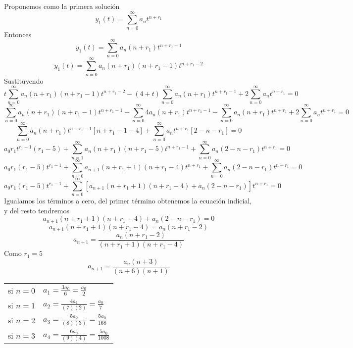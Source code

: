 \documentclass{article}
\begin{document}
\begin{enumerate}
{            Proponemos como la primera solución
            $$y_1(t)=\sum_{n=0}^{\infty}{a_nt^{n+r_1}}$$
            Entonces
            $$\dot y_1(t)=\sum_{n=0}^{\infty}{a_n(n+r_1)t^{n+r_1-1}}$$
            $$\ddot y_1(t)=\sum_{n=0}^{\infty}{a_n(n+r_1)(n+r_1-1)t^{n+r_1-2}}$$
            Sustituyendo
            \[
                t\sum_{n=0}^{\infty}{a_n(n+r_1)(n+r_1-1)t^{n+r_1-2}}
                -(4+t)\sum_{n=0}^{\infty}{a_n(n+r_1)t^{n+r_1-1}}
                +2\sum_{n=0}^{\infty}{a_nt^{n+r_1}}=0
            \]
            \[
                \sum_{n=0}^{\infty}{a_n(n+r_1)(n+r_1-1)t^{n+r_1-1}}
                -\sum_{n=0}^{\infty}{4a_n(n+r_1)t^{n+r_1-1}}
                -\sum_{n=0}^{\infty}{a_n(n+r_1)t^{n+r_1}}
                +2\sum_{n=0}^{\infty}{a_nt^{n+r_1}}=0
            \]
            \[
                \sum_{n=0}^{\infty}{a_n(n+r_1)t^{n+r_1-1}[n+r_1-1-4]}
                +\sum_{n=0}^{\infty}{a_nt^{n+r_1}[2-n-r_1]}=0
            \]
            \[
                a_0r_1t^{r_1-1}(r_1-5)
                +\sum_{n=1}^{\infty}{a_n(n+r_1)(n+r_1-5)t^{n+r_1-1}}
                +\sum_{n=0}^{\infty}{a_n(2-n-r_1)t^{n+r_1}}=0
            \]
            \[
                a_0r_1(r_1-5)t^{r_1-1}
                +\sum_{n=0}^{\infty}{a_{n+1}(n+r_1+1)(n+r_1-4)t^{n+r_1}}
                +\sum_{n=0}^{\infty}{a_n(2-n-r_1)t^{n+r_1}}=0
            \]
            \[
                a_0r_1(r_1-5)t^{r_1-1}
                +\sum_{n=0}^{\infty}{[
                    a_{n+1}(n+r_1+1)(n+r_1-4)
                    +a_n(2-n-r_1)
                ]t^{n+r_1}}=0
            \]
            Igualamos los términos a cero, del primer término obtenemos la ecuación indicial, y del resto tendremos
            \[a_{n+1}(n+r_1+1)(n+r_1-4)+a_n(2-n-r_1)=0\]
            \[a_{n+1}(n+r_1+1)(n+r_1-4)=a_n(n+r_1-2)\]
            \begin{equation}
                a_{n+1}=\frac{a_n(n+r_1-2)}{(n+r_1+1)(n+r_1-4)}
                \label{recurrente}
            \end{equation}
            Como $r_1=5$
            \[a_{n+1}=\frac{a_n(n+3)}{(n+6)(n+1)}\]
            \begin{center}
                \begin{tabular}{ll}
                    si $n=0$ & $a_1=\frac{3a_0}{6}=\frac{a_0}{2}$ \\
                    si $n=1$ & $a_2=\frac{4a_1}{(7)(2)}=\frac{a_0}{7}$ \\
                    si $n=2$ & $a_3=\frac{5a_2}{(8)(3)}=\frac{5a_0}{168}$ \\
                    si $n=3$ & $a_4=\frac{6a_3}{(9)(4)}=\frac{5a_0}{1008}$ \\

\end{tabular}
\end{center}}
\end{enumerate}
\end{document}

